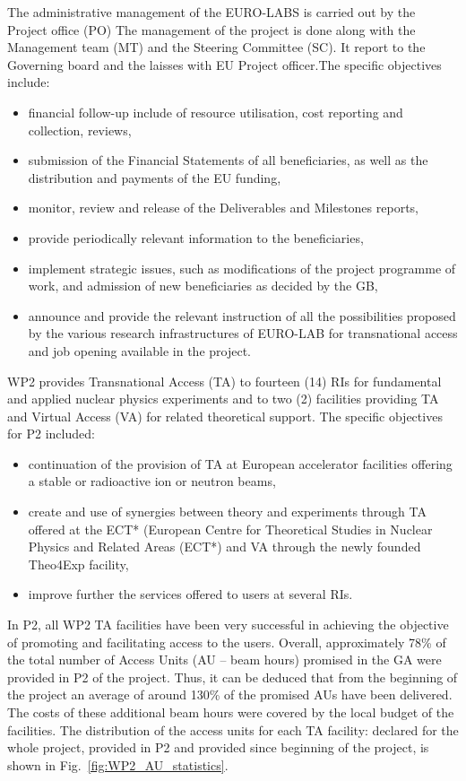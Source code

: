 The administrative management of the EURO-LABS is carried out by the Project office (PO) The management of the project is done along with the Management team (MT) and the Steering Committee (SC). It report to the Governing board and the laisses with EU Project officer.The specific objectives include:
\begin{itemize}
    \item financial follow-up include of resource utilisation, cost reporting and collection, reviews,
    \item submission of the Financial Statements of all beneficiaries, as well as the distribution and payments of the EU funding,
    \item monitor, review and release of the Deliverables and Milestones reports,
    \item provide periodically relevant information to the beneficiaries,
    \item implement strategic issues, such as modifications of the project programme of work, and admission of new beneficiaries as decided by the GB,
    \item announce and provide the relevant instruction of all the possibilities   proposed by the various research infrastructures of EURO-LAB for transnational access and job opening available in the project.
\end{itemize}


WP2 provides Transnational Access (TA) to fourteen (14) RIs for fundamental and applied nuclear physics experiments and to two (2) facilities providing TA and Virtual Access (VA) for related theoretical support. 
The specific objectives for P2 included: 
\begin{itemize}
    \item continuation of the provision of TA at European accelerator facilities offering a stable or radioactive ion or neutron beams,
    \item create and use of synergies between theory and experiments through TA offered at the ECT* (European Centre for Theoretical Studies in Nuclear Physics and Related Areas (ECT*) and VA through the newly founded Theo4Exp facility,
    \item improve further the services offered to users at several RIs.
\end{itemize}

In P2, all WP2 TA facilities have been very successful in achieving the objective of promoting and facilitating access to the users. Overall, approximately 78\% of the total number of Access Units (AU – beam hours) promised in the GA were provided in P2 of the project. Thus, it can be deduced that from the beginning of the project an average of around 130\% of the promised AUs have been delivered. The costs of these additional beam hours were covered by the local budget of the facilities. The distribution of the access units for each TA facility: declared for the whole project, provided in P2 and provided since beginning of the project, is shown in Fig.~\ref{fig:WP2_AU_statistics}.

